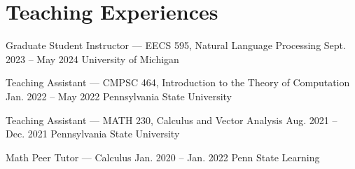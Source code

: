 \section{Teaching Experiences}
\CVEntry
  {Graduate Student Instructor --- EECS 595, Natural Language Processing}
  {Sept. 2023 -- May 2024}
  {University of Michigan}
\CVGap

\CVEntry
  {Teaching Assistant --- CMPSC 464, Introduction to the Theory of Computation}
  {Jan. 2022 -- May 2022}
  {Pennsylvania State University}
\CVGap

\CVEntry
  {Teaching Assistant --- MATH 230, Calculus and Vector Analysis}
  {Aug. 2021 -- Dec. 2021}
  {Pennsylvania State University}
\CVGap

\CVEntry
  {Math Peer Tutor --- Calculus}
  {Jan. 2020 -- Jan. 2022}
  {Penn State Learning}
\CVGap
